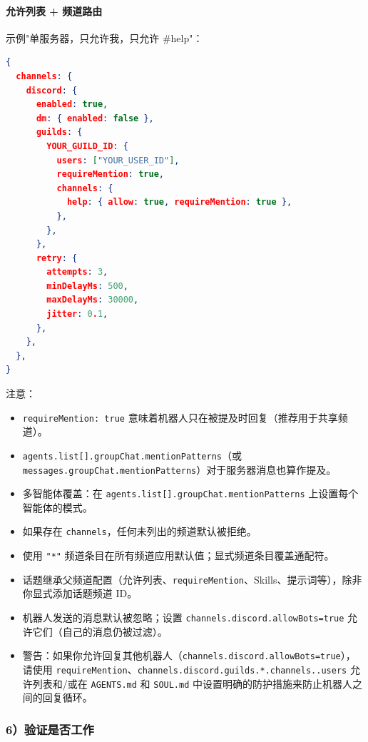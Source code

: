 \paragraph{允许列表 + 频道路由}


示例"单服务器，只允许我，只允许 \#help"：

\begin{lstlisting}[language=json]
{
  channels: {
    discord: {
      enabled: true,
      dm: { enabled: false },
      guilds: {
        YOUR_GUILD_ID: {
          users: ["YOUR_USER_ID"],
          requireMention: true,
          channels: {
            help: { allow: true, requireMention: true },
          },
        },
      },
      retry: {
        attempts: 3,
        minDelayMs: 500,
        maxDelayMs: 30000,
        jitter: 0.1,
      },
    },
  },
}
\end{lstlisting}


注意：

\begin{itemize}
  \item \texttt{requireMention: true} 意味着机器人只在被提及时回复（推荐用于共享频道）。
  \item \texttt{agents.list[].groupChat.mentionPatterns}（或 \texttt{messages.groupChat.mentionPatterns}）对于服务器消息也算作提及。
  \item 多智能体覆盖：在 \texttt{agents.list[].groupChat.mentionPatterns} 上设置每个智能体的模式。
  \item 如果存在 \texttt{channels}，任何未列出的频道默认被拒绝。
  \item 使用 \texttt{"*"} 频道条目在所有频道应用默认值；显式频道条目覆盖通配符。
  \item 话题继承父频道配置（允许列表、\texttt{requireMention}、Skills、提示词等），除非你显式添加话题频道 ID。
  \item 机器人发送的消息默认被忽略；设置 \texttt{channels.discord.allowBots=true} 允许它们（自己的消息仍被过滤）。
  \item 警告：如果你允许回复其他机器人（\texttt{channels.discord.allowBots=true}），请使用 \texttt{requireMention}、\texttt{channels.discord.guilds.*.channels..users} 允许列表和/或在 \texttt{AGENTS.md} 和 \texttt{SOUL.md} 中设置明确的防护措施来防止机器人之间的回复循环。
\end{itemize}


\subsubsection{6）验证是否工作}


